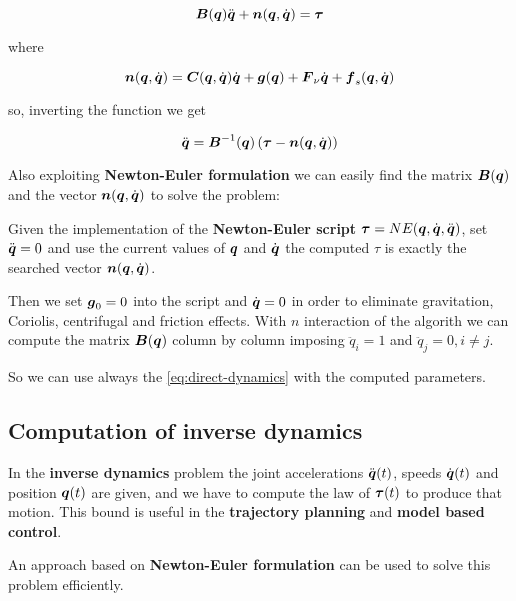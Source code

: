 \[
	\boldsymbol{B}(\boldsymbol{q})\ddot{\boldsymbol{q}} + \boldsymbol{n}(\boldsymbol{q},\dot{\boldsymbol{q}}) = \boldsymbol{\tau}
\]

where

\[
	\boldsymbol{n}(\boldsymbol{q},\dot{\boldsymbol{q}}) = \boldsymbol{C}(\boldsymbol{q},\dot{\boldsymbol{q}})\dot{\boldsymbol{q}} + \boldsymbol{g}(\boldsymbol{q}) + \boldsymbol{F}_\nu \dot{\boldsymbol{q}} + \boldsymbol{f}_s(\boldsymbol{q},\dot{\boldsymbol{q}})
\]

so, inverting the function we get

\begin{equation}
    \ddot{\boldsymbol{q}} = \boldsymbol{B}^{-1}(\boldsymbol{q}) \left( \boldsymbol{\tau} - \boldsymbol{n}(\boldsymbol{q},\dot{\boldsymbol{q}}) \right) \label{eq:direct-dynamics}
\end{equation}

Also exploiting \textbf{Newton-Euler formulation} we can easily find the matrix $\boldsymbol{B}(\boldsymbol{q})$ and the vector $\boldsymbol{n}(\boldsymbol{q},\dot{\boldsymbol{q}})$ to solve the problem:

Given the implementation of the \textbf{Newton-Euler script} $\boldsymbol{\tau} = NE(\boldsymbol{q},\dot{\boldsymbol{q}},\ddot{\boldsymbol{q}})$, set $\ddot{\boldsymbol{q}}=0$ and use the current values of $\boldsymbol{q}$ and $\dot{\boldsymbol{q}}$ the computed $\tau$ is exactly the searched vector $\boldsymbol{n}(\boldsymbol{q},\dot{\boldsymbol{q}})$.

Then we set $\boldsymbol{g}_0 = 0$ into the script and $\dot{\boldsymbol{q}} = 0$ in order to eliminate gravitation, Coriolis, centrifugal and friction effects.
With $n$ interaction of the algorith we can compute the matrix $\boldsymbol{B}(\boldsymbol{q})$ column by column imposing $\ddot q_i=1$ and $\ddot q_j=0, i \neq j$.

So we can use always the \autoref{eq:direct-dynamics} with the computed parameters.

\subsection{Computation of inverse dynamics}

In the \textbf{inverse dynamics} problem the joint accelerations $\ddot{\boldsymbol{q}}(t)$, speeds $\dot{\boldsymbol{q}}(t)$ and position $\boldsymbol{q}(t)$ are given, and we have to compute the law of $\boldsymbol{\tau}(t)$ to produce that motion.
This bound is useful in the \textbf{trajectory planning} and \textbf{model based control}.

An approach based on \textbf{Newton-Euler formulation} can be used to solve this problem efficiently.
